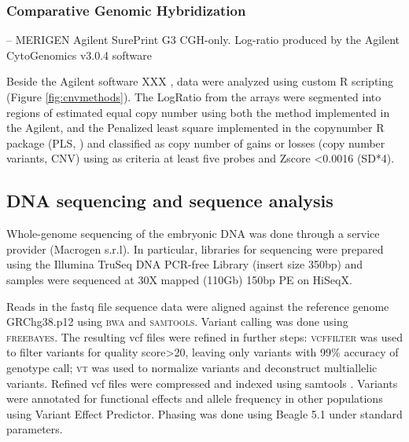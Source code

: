 \subsubsection*{Comparative Genomic Hybridization} 
-- MERIGEN Agilent SurePrint G3 CGH-only. Log-ratio produced by the Agilent CytoGenomics v3.0.4 software 

Beside the Agilent software XXX , data were analyzed using custom R scripting (Figure \ref{fig:cnvmethods}). The LogRatio from the arrays were segmented into regions of estimated equal copy number using both the method implemented in the Agilent, and the Penalized least square implemented in the copynumber R package (PLS, \cite{nilsen2012copynumber}) and classified as copy number of gains or losses (copy number variants, CNV) using as criteria at least five probes and Zscore <0.0016 (SD*4)\cite{vermeesch2005molecular}. 



\subsection*{DNA sequencing and sequence analysis}
Whole-genome sequencing of the embryonic DNA was done through a service provider (Macrogen s.r.l). In particular, libraries for sequencing were prepared using the Illumina TruSeq DNA PCR-free Library (insert size 350bp) and samples were sequenced at 30X mapped (110Gb) 150bp PE on HiSeqX. 

Reads in the fastq file sequence data were aligned against the reference genome GRChg38.p12 \cite{rosenbloom2015ucsc} using \textsc{bwa}\cite{li2013aligning} and \textsc{samtools}\cite{li2011statistical}. Variant calling was done using \textsc{freebayes}\cite{garrison2012haplotype}. The resulting vcf files were refined in further steps: \textsc{vcffilter} \cite{vcflib} was used to filter variants for quality score>20, leaving only variants with 99\% accuracy of genotype call; \textsc{vt}\cite{tan2015unified} was used to normalize variants and deconstruct multiallelic variants. Refined vcf files were compressed and indexed using samtools \cite{li2011statistical}. Variants were annotated for functional effects and allele frequency in other populations using Variant Effect Predictor\cite{mclaren2016ensembl}. Phasing was done using Beagle 5.1\cite{browning2018one} under standard parameters.  

